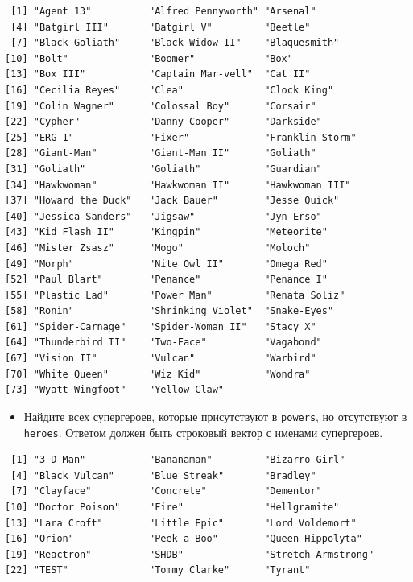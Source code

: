\documentclass[
]{book}
\providecommand{\tightlist}{%
  \setlength{\itemsep}{0pt}\setlength{\parskip}{0pt}}
\begin{document}
\begin{verbatim}
 [1] "Agent 13"          "Alfred Pennyworth" "Arsenal"          
 [4] "Batgirl III"       "Batgirl V"         "Beetle"           
 [7] "Black Goliath"     "Black Widow II"    "Blaquesmith"      
[10] "Bolt"              "Boomer"            "Box"              
[13] "Box III"           "Captain Mar-vell"  "Cat II"           
[16] "Cecilia Reyes"     "Clea"              "Clock King"       
[19] "Colin Wagner"      "Colossal Boy"      "Corsair"          
[22] "Cypher"            "Danny Cooper"      "Darkside"         
[25] "ERG-1"             "Fixer"             "Franklin Storm"   
[28] "Giant-Man"         "Giant-Man II"      "Goliath"          
[31] "Goliath"           "Goliath"           "Guardian"         
[34] "Hawkwoman"         "Hawkwoman II"      "Hawkwoman III"    
[37] "Howard the Duck"   "Jack Bauer"        "Jesse Quick"      
[40] "Jessica Sanders"   "Jigsaw"            "Jyn Erso"         
[43] "Kid Flash II"      "Kingpin"           "Meteorite"        
[46] "Mister Zsasz"      "Mogo"              "Moloch"           
[49] "Morph"             "Nite Owl II"       "Omega Red"        
[52] "Paul Blart"        "Penance"           "Penance I"        
[55] "Plastic Lad"       "Power Man"         "Renata Soliz"     
[58] "Ronin"             "Shrinking Violet"  "Snake-Eyes"       
[61] "Spider-Carnage"    "Spider-Woman II"   "Stacy X"          
[64] "Thunderbird II"    "Two-Face"          "Vagabond"         
[67] "Vision II"         "Vulcan"            "Warbird"          
[70] "White Queen"       "Wiz Kid"           "Wondra"           
[73] "Wyatt Wingfoot"    "Yellow Claw"      
\end{verbatim}

\begin{itemize}
\tightlist
\item
  Найдите всех супергероев, которые присутствуют в \texttt{powers}, но отсутствуют в \texttt{heroes}. Ответом должен быть строковый вектор с именами супергероев.
\end{itemize}

\begin{verbatim}
 [1] "3-D Man"           "Bananaman"         "Bizarro-Girl"     
 [4] "Black Vulcan"      "Blue Streak"       "Bradley"          
 [7] "Clayface"          "Concrete"          "Dementor"         
[10] "Doctor Poison"     "Fire"              "Hellgramite"      
[13] "Lara Croft"        "Little Epic"       "Lord Voldemort"   
[16] "Orion"             "Peek-a-Boo"        "Queen Hippolyta"  
[19] "Reactron"          "SHDB"              "Stretch Armstrong"
[22] "TEST"              "Tommy Clarke"      "Tyrant"           
\end{verbatim}
\end{document}
